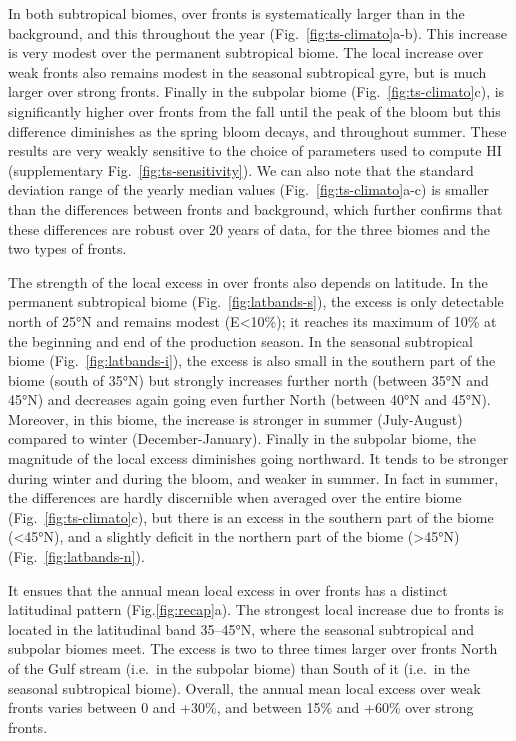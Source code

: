 In both subtropical biomes,  over fronts is systematically larger than in the background, and this throughout the year (Fig.~\ref{fig:ts-climato}a-b).
This increase is very modest over the permanent subtropical biome.
The local increase over weak fronts also remains modest in the seasonal subtropical gyre, but is much larger over strong fronts.
Finally in the subpolar biome (Fig.~\ref{fig:ts-climato}c),  is significantly higher over fronts from the fall until the peak of the bloom but this difference diminishes as the spring bloom decays, and throughout summer.
These results are very weakly sensitive to the choice of parameters used to compute HI (supplementary Fig.~\ref{fig:ts-sensitivity}).
We can also note that the standard deviation range of the yearly median values (Fig.~\ref{fig:ts-climato}a-c) is smaller than the differences between fronts and background, which further confirms that these differences are robust over 20 years of data, for the three biomes and the two types of fronts.

The strength of the local excess in  over fronts also depends on latitude.
In the permanent subtropical biome (Fig.~\ref{fig:latbands-s}), the excess is only detectable north of 25°N and remains modest (E<10\%); it reaches its maximum of 10\% at the beginning and end of the production season.
In the seasonal subtropical biome (Fig.~\ref{fig:latbands-i}), the excess is also small in the southern part of the biome (south of 35°N) but strongly increases further north (between 35°N and 45°N) and decreases again going even further North (between 40°N and 45°N).
Moreover, in this biome, the increase is stronger in summer (July-August) compared to winter (December-January).
Finally in the subpolar biome, the magnitude of the local excess diminishes going northward.
It tends to be stronger during winter and during the bloom, and weaker in summer.
In fact in summer, the differences are hardly discernible when averaged over the entire biome (Fig.~\ref{fig:ts-climato}c), but there is an excess  in the southern part of the biome (\textless45°N), and a slightly deficit in the northern part of the biome (\textgreater45°N) (Fig.~\ref{fig:latbands-n}).

It ensues that the annual mean local excess in  over fronts has a distinct latitudinal pattern (Fig.\ref{fig:recap}a).
The strongest local increase due to fronts is located in the latitudinal band 35--45°N, where the seasonal subtropical and subpolar biomes meet.
The excess is two to three times larger over fronts North of the Gulf stream (i.e.\ in the subpolar biome) than South of it (i.e.\ in the seasonal subtropical biome).
Overall, the annual mean local excess over weak fronts varies between 0 and +30\%, and between 15\% and +60\% over strong fronts.



